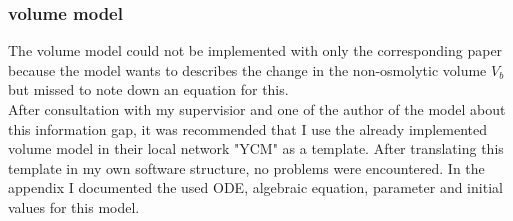 \subsubsection{volume model}
The volume model could not be implemented with only the corresponding paper because the model wants to describes the change in the non-osmolytic volume $V_b$ but missed to note down an equation for this.\\
After consultation with my supervisior and one of the author of the model about this information gap, it was recommended that I use the already implemented volume model in their local network "YCM" as a template. After translating this template in my own software structure, no problems were encountered. In the appendix I documented the used ODE, algebraic equation, parameter and initial values for this model. 

